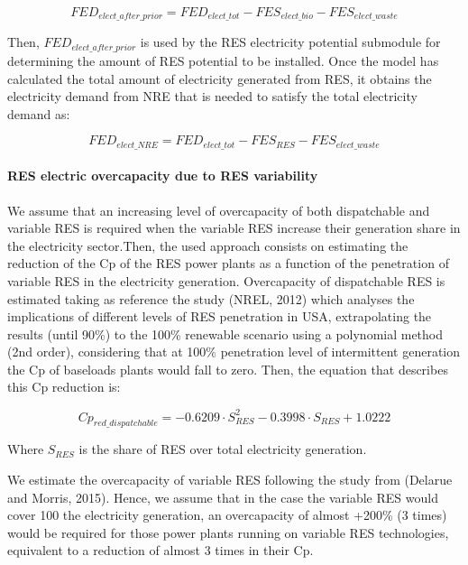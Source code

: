 \begin{equation}
    FED_{elect\_after\_prior}= FED_{elect\_tot}-FES_{elect\_bio}-FES_{elect\_waste}
    \label{eq:FED-after-priorities}
\end{equation}

Then, $FED_{elect\_after\_prior}$ is used by the RES electricity potential submodule for determining the amount of RES potential to be installed.
Once the model has calculated the total amount of electricity generated from RES, it obtains the electricity demand from NRE that is needed to satisfy the total electricity demand as:

\begin{equation}
    FED_{elect\_NRE}= FED_{elect\_tot}-FES_{RES}-FES_{elect\_waste}
    \label{eq:FED-elect-NRE}
\end{equation}

\paragraph{RES electric overcapacity due to RES variability}

We assume that an increasing level of overcapacity of both dispatchable and variable RES is required when the variable RES increase their generation share in the electricity sector.Then, the used approach consists on estimating the reduction of the Cp of the RES power plants as a function of the penetration of variable RES in the electricity generation.
Overcapacity of dispatchable RES is estimated taking as reference the study (NREL, 2012) which analyses the implications of different levels of RES penetration in USA, extrapolating the results (until 90\%) to the 100\% renewable scenario using a polynomial method (2nd order), considering that at 100\% penetration level of intermittent generation the Cp of baseloads plants would fall to zero. Then, the equation that describes this Cp reduction is:

\begin{equation}
    Cp_{red\_dispatchable}=-0.6209 \cdot S_{RES}^2-0.3998 \cdot S_{RES} + 1.0222
    \label{eq:cp-reduction-dispatchable}
\end{equation}

Where $S_{RES}$ is the share of RES over total electricity generation. 

We estimate the overcapacity of variable RES following the study from (Delarue and Morris, 2015). Hence, we assume that in the case the variable RES would cover 100%
the electricity generation, an overcapacity of almost +200\% (3 times) would be required for those
power plants running on variable RES technologies, equivalent to a reduction of almost 3 times in
their Cp.

